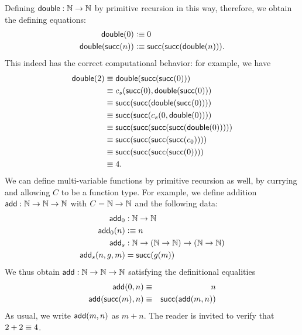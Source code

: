 Defining $\mathsf{double}:\mathbb{N}\to\mathbb{N}$ by primitive recursion in this way, therefore, we obtain the defining equations:
\begin{align*}
  \mathsf{double}(0) &\vcentcolon\equiv 0\\
  \mathsf{double}(\mathsf{succ}(n)) &\vcentcolon\equiv \mathsf{succ}(\mathsf{succ}(\mathsf{double}(n))).
\end{align*}
This indeed has the correct computational behavior: for example, we have 
\begin{align*}
  \mathsf{double}(2) &\equiv \mathsf{double}(\mathsf{succ}(\mathsf{succ}(0)))\\
  & \equiv c_s(\mathsf{succ}(0), \mathsf{double}(\mathsf{succ}(0))) \\
                 & \equiv \mathsf{succ}(\mathsf{succ}(\mathsf{double}(\mathsf{succ}(0)))) \\
                 & \equiv \mathsf{succ}(\mathsf{succ}(c_s(0,\mathsf{double}(0)))) \\
                 & \equiv \mathsf{succ}(\mathsf{succ}(\mathsf{succ}(\mathsf{succ}(\mathsf{double}(0))))) \\
                 & \equiv \mathsf{succ}(\mathsf{succ}(\mathsf{succ}(\mathsf{succ}(c_0)))) \\
                 & \equiv \mathsf{succ}(\mathsf{succ}(\mathsf{succ}(\mathsf{succ}(0))))\\
                 &\equiv 4.
\end{align*}
We can define multi-variable functions by primitive recursion as well, by currying and allowing $C$ to be a function type.
For example, we define addition $\mathsf{add} : \mathbb{N} \to \mathbb{N} \to \mathbb{N}$ with $C = \mathbb{N} \to \mathbb{N}$ and the following data:
\begin{align*}
  \mathsf{add}_0 & : \mathbb{N} \to \mathbb{N} \\
  \mathsf{add}_0 (n) & \vcentcolon\equiv n \\
  \mathsf{add}_s & : \mathbb{N} \to (\mathbb{N} \to \mathbb{N}) \to (\mathbb{N} \to \mathbb{N}) \\
  \mathsf{add}_s(n,g,m) & = \mathsf{succ}(g(m))
\end{align*}
We thus obtain $\mathsf{add} : \mathbb{N} \to \mathbb{N} \to \mathbb{N}$ satisfying the definitional equalities
\begin{eqnarray*}
  \mathsf{add}(0,n) & \equiv & n \\
  \mathsf{add}(\mathsf{succ}(m),n) & \equiv & \mathsf{succ}(\mathsf{add}(m,n)) 
\end{eqnarray*}
As usual, we write $\mathsf{add}(m,n)$ as $m+n$.
The reader is invited to verify that $2+2\equiv 4$.

